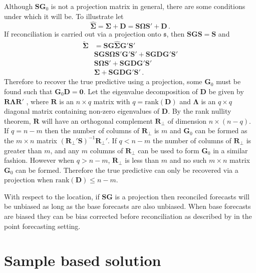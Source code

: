 \documentclass[12pt]{article}
\theoremstyle{definition}
\begin{document}
Although ${\bm S}{\bm G}_0$ is not a projection matrix in general, there are some conditions under which it will be.  To illustrate let
\[
\hat{\bm{\Sigma}}=\bm{\Sigma}+{\bm D}=\bm{S}\bm{\Omega}{\bm{S}}'+{\bm D}\,.
\]
If reconciliation is carried out via a projection onto $\mathfrak{s}$, then $\bm{S}\bm{G}\bm{S}=\bm{S}$ and
\begin{align}
\tilde{\bm{\Sigma}}&=\bm{S}\bm{G}\hat{\bm{\Sigma}}\bm{G}'\bm{S}'\nonumber\\
&\bm{S}\bm{G}\bm{S}\bm{\Omega}\bm{S}'\bm{G}'{\bm{S}}'+\bm{S}\bm{G}{\bm D}\bm{G}'\bm{S}'\nonumber\\
&\bm{S}\bm{\Omega}{\bm{S}}'+\bm{S}\bm{G}{\bm D}\bm{G}'\bm{S}'\nonumber\\
&\bm{\Sigma}+\bm{S}\bm{G}{\bm D}\bm{G}'\bm{S}'\nonumber\,.
\end{align}
Therefore to recover the true predictive using a projection, some ${\bm G}_0$ must be found such that ${\bm G}_0{\bm D}=\bm{0}$. Let the eigenvalue decomposition of $\bm {D}$ be given by  ${\bm R}{\bm \Lambda}{\bm R}'$ , where ${\bm R}$ is an $n\times q$ matrix with $q=\textrm{rank}({\bm{D}})$ and ${\bm\Lambda}$ is an $q\times q$ diagonal matrix containing non-zero eigenvalues of ${\bm D}$.  By the rank nullity theorem, $\bm{R}$ will have an orthogonal complement $\bm{R}_{\perp}$ of dimension $n\times (n-q)$.  If $q=n-m$ then the number of columns of $\bm{R}_{\perp}$ is $m$ and ${\bm G}_0$ can be formed as the $m\times n$ matrix $(\bm{R}_{\perp}'\bm{S})^{-1}\bm{R}_{\perp}'$.  If $q<n-m$ the number of columns of $\bm{R}_{\perp}$ is greater than $m$, and any $m$ columns of $\bm{R}_{\perp}$ can be used to form ${\bm G}_0$ in a similar fashion.  However when $q>n-m$, $\bm{R}_{\perp}$ is less than $m$ and no such $m\times n$ matrix ${\bm G}_0$ can be formed.  Therefore the true predictive can only be recovered via a projection when $\textrm{rank}({\bm D})\leq n-m$.
 
With respect to the location, if $\bm{SG}$ is a projection then reconciled forecasts will be unbiased as long as the base forecasts are also unbiased.  When base forecasts are biased they can be bias corrected before reconciliation as described by \cite{PanEtAl2019HF} in the point forecasting setting.

\section{Sample based solution}\label{sec:non-para}
\end{document}
